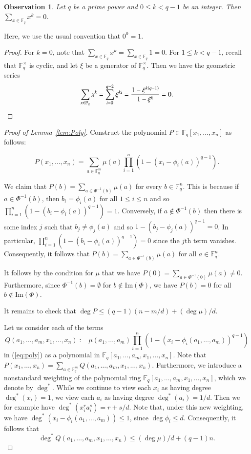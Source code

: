 \documentclass[11pt, reqno]{amsart}
\newtheorem{obs}[theorem]{Observation}
\theoremstyle{definition}
\newcommand{\F}{\mathbb{F}}
\begin{document}
\begin{obs}\label{obs:sum}
Let $q$ be a prime power and $0 \leq k < q-1$ be an integer. Then $\sum_{x \in \F_q} x^k = 0$.
\end{obs}

Here, we use the usual convention that $0^0=1$.

\begin{proof}
For $k=0$, note that $\sum_{x \in \F_q} x^k = \sum_{x \in \F_q} 1=0$. For $1\le k<q-1$, recall that $\F_q^{\times}$ is cyclic, and let $\xi$ be a generator of $\F_q^\times$. Then we have the geometric series
\[ \sum_{x \in \F_q} x^k = \sum_{i=0}^{q-2} \xi^{ki} = \frac{1 - \xi^{k(q-1)}}{1 - \xi^k} = 0.\qedhere\]
\end{proof}

\begin{proof}[Proof of Lemma~\ref{lem:Poly}]
Construct the polynomial $P \in \F_q[x_1, \ldots, x_n]$ as follows:

\begin{equation}\label{eq:poly}
    P(x_1, \ldots, x_n) = \sum_{a \in \F_q^m} \mu(a) \prod_{i=1}^{n} \left( 1 - (x_i - \phi_i(a))^{q-1} \right).
\end{equation}

We claim that $P(b) = \sum_{a \in \Phi^{-1}(b)} \mu(a)$ for every $b \in \F_q^n$. This is because if $a \in \Phi^{-1}(b)$, then $b_i = \phi_i(a)$ for all $ 1 \leq i \leq n$ and so $\prod_{i=1}^{n}( 1 - (b_i - \phi_i(a))^{q-1} ) = 1$. Conversely, if $a \not \in \Phi^{-1}(b)$ then there is some index $j$ such that $b_j \neq \phi_j(a)$ and so $1 - (b_j - \phi_j(a))^{q-1} = 0$. In particular, $\prod_{i=1}^{n}( 1 - (b_i - \phi_i(a))^{q-1} ) = 0$ since the $j$th term vanishes. Consequently, it follows that $P(b) = \sum_{a \in \Phi^{-1}(b)} \mu(a)$ for all $a \in \F_q^n$.

It follows by the condition for $\mu$ that we have $P(0) = \sum_{a \in \Phi^{-1}(0)} \mu(a) \neq 0$. Furthermore, since $\Phi^{-1}(b) = \emptyset$ for $b \not \in \mathrm{Im}(\Phi)$, we have $P(b) = 0$ for all $b \not \in \mathrm{Im}(\Phi)$. 

It remains to check that $\deg P\le (q-1)(n - m/d) + (\deg \mu)/d$.

Let us consider each of the terms
\[Q(a_1, \ldots, a_m,x_1, \ldots, x_n) := \mu(a_1, \ldots, a_m)\prod_{i=1}^{n} (1 - (x_i - \phi_i(a_1, \ldots, a_m))^{q-1}) \]
in (\ref{eq:poly}) as a polynomial in $\F_q[a_1, \ldots, a_m, x_1, \ldots, x_n]$. Note that $P(x_1, \ldots, x_n) = \sum_{a \in \F_q^m}  Q(a_1, \ldots, a_m,x_1, \ldots, x_n)$. Furthermore, we introduce a nonstandard weighting of the polynomial ring $\F_q[a_1, \ldots, a_m, x_1, \ldots, x_n]$, which we denote by $\deg^*$. While we continue to view each $x_i$ as having degree $\deg^*(x_i)=1$, we view each $a_i$ as having degree $\deg^*(a_i)=1/d$. Then we for example have $\deg^*(x_i^{r} a_i^{s}) = r+ s/d$. Note that, under this new weighting, we have $\deg^*(x_i - \phi_i(a_1,\ldots,a_m)) \leq 1$, since $\deg \phi_i \leq d$. Consequently, it follows that 
\begin{equation}\label{eq:degQ}
    \deg^* Q(a_1, \ldots, a_m, x_1, \ldots, x_n) \leq (\deg \mu)/d + (q-1)n.
\end{equation}


\end{proof}
\end{document}
